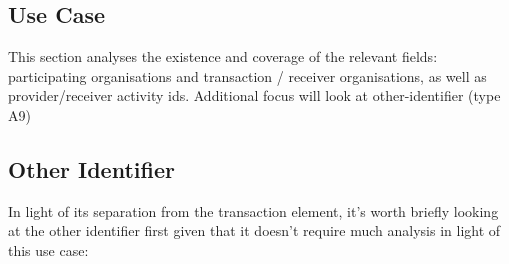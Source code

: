 \documentclass[letterpaper,10pt,english]{sphinxmanual}
\begin{document}
\subsection{Use Case}
\label{\detokenize{Global Affairs Canada - Compliance Report:Use-Case}}

This section analyses the existence and coverage of the relevant fields:
participating organisations and transaction / receiver organisations, as
well as provider/receiver activity ids. Additional focus will look at
other-identifier (type A9)


\subsection{Other Identifier}
\label{\detokenize{Global Affairs Canada - Compliance Report:Other-Identifier}}
In light of its separation from the transaction element, it's worth
briefly looking at the other identifier first given that it doesn't
require much analysis in light of this use case:
\end{document}
